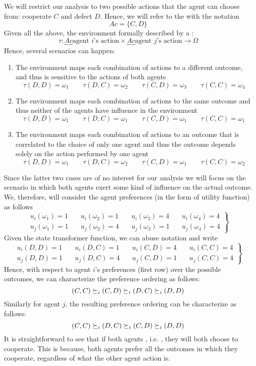 	We will restrict our analysis to two possible actions that the agent can choose from: cooperate $C$ and defect $D$. Hence, we will refer to the  with the notation
	\[Ac = \{C,D\}\]
	Given all the above, the environment formally described by a :
	\[\tau: \underbrace{Ac}{\text{agent $i$’s action}}\times\underbrace{Ac}{\text{agent $j$’s action}}\rightarrow \Omega\]
	Hence, several scenarios can happen:
	\begin{enumerate}
	\item The environment maps each combination of actions to a different outcome, and thus is sensitive to the actions of both agents
	\[\tau(D,D)=\omega_1\qquad\tau(D,C)=\omega_2\qquad\tau(C,D)=\omega_3\qquad\tau(C,C)=\omega_4\]
	\item The environment maps each combination of actions to the same outcome and thus neither of the agents have influence in the environment
	\[\tau(D,D)=\omega_1\qquad\tau(D,C)=\omega_1\qquad\tau(C,D)=\omega_1\qquad\tau(C,C)=\omega_1\]
	\item The environment maps each combination of actions to an outcome that is correlated to the choice of only one agent and thus the outcome depends solely on the action performed by one agent
	\[\tau(D,D)=\omega_1\qquad\tau(D,C)=\omega_2\qquad\tau(C,D)=\omega_1\qquad\tau(C,C)=\omega_2\]	
	\end{enumerate}
	Since the latter two cases are of no interest for our analysis we will focus on the scenario in which both agents exert some kind of influence on the actual outcome. We, therefore, will consider the agent preferences (in the form of utility function) as follows
	\[
	\left.
	\begin{aligned}
	u_i(\omega_1) = 1&\quad u_i(\omega_2) = 1&\quad u_i(\omega_3) = 4&\quad u_i(\omega_4) = 4\\
	u_j(\omega_1) = 1&\quad u_j(\omega_2) = 4&\quad u_j(\omega_3) = 1&\quad u_j(\omega_4) = 4
	\end{aligned}
	\right\}
	\]
	Given the state transformer function, we can abuse notation and write
	\[
	\left.
	\begin{aligned}
	u_i(D,D) = 1&\quad u_i(D,C) = 1&\quad u_i(C,D) = 4&\quad u_i(C,C) = 4\\
	u_j(D,D) = 1&\quad u_j(D,C) = 4&\quad u_j(C,D) = 1&\quad u_j(C,C) = 4
	\end{aligned}
	\right\}
	\]
	Hence, with respect to agent $i$’s preferences (first row) over the possible outcomes, we can characterize the preference ordering as follows:
	\[(C,C) \succeq_i(C,D) \succeq_i(D,C) \succeq_i(D,D) \]
	Similarly for agent $j$, the resulting preference ordering can be characterize as follows:
	\[(C,C) \succeq_i(D,C) \succeq_i(C,D) \succeq_i(D,D) \]
	It is straightforward to see that if both agents , i.e. \cite{mastxt}, they will both choose to cooperate.
	This is because, both agents prefer all the outcomes in which they cooperate, regardless of what the other agent action is.
	
